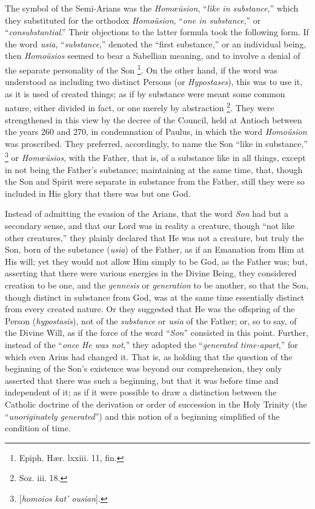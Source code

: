 The symbol of the Semi-Arians was the \emph{Homœüsion}, ``\emph{like
in substance},'' which they substituted for the orthodox \emph{Homoüsion},
``\emph{one in substance},'' or ``\emph{consubstantial}.''
Their objections to the latter formula took the following form. If the
word \emph{usia}, ``\emph{substance},'' denoted the
``first substance,'' or an individual being, then \emph{Homoüsios}
seemed to bear a Sabellian meaning, and to involve a denial of the
separate personality of the Son \footnote{Epiph. Hær. lxxiii. 11, fin.}. On the other hand, if the word was understood as including two
distinct Persons (or \emph{Hypostases}), this was to use it, as
it is used of created things; as if by substance were meant some
common nature, either divided in fact, or one merely by abstraction \footnote{Soz. iii. 18.}. They were strengthened in this view by the decree of the
Council, held at Antioch between the years 260 and 270, in
condemnation of Paulus, in which the word \emph{Homoüsion} was
proscribed. They preferred, accordingly, to name the Son ``like in
substance,'' \footnote{[\emph{homoios kat' ousian}].} or \emph{Homœüsios},
with the Father, that is, of a substance like in all things, except in
not being the Father's substance; maintaining at the same time, that,
though the Son and Spirit were separate in substance from the Father,
still they were so included in His glory that there was but one God.

Instead of admitting the evasion of the Arians, that the word \emph{Son}
had but a secondary sense, and that our Lord was in reality a
creature, though ``not like other creatures,'' they plainly
declared that He was not a creature, but truly the Son, born of the
substance (\emph{usia}) of the Father, as if an Emanation from Him at
His will; yet they would not allow Him simply to be God, as the Father
was; but, asserting that there were various energies in the Divine
Being, they considered creation to be one, and the \emph{gennesis} or \emph{generation}
to be another, so that the Son, though distinct in substance from God,
was at the same time essentially distinct from every created nature.
Or they suggested that He was the offspring of the Person (\emph{hypostasis}),
not of the \emph{substance} or \emph{usia} of the Father; or, so to
say, of the Divine Will, as if the force of the word ``\emph{Son}''
consisted in this point. Further, instead of the ``\emph{once}
\emph{He was not},'' they adopted the ``\emph{generated
time-apart},'' for which even Arius had changed it. That is, as
holding that the question of the beginning of the Son's existence was
beyond our comprehension, they only asserted that there was such a
beginning, but that it was before time and independent of it; as if it
were possible to draw a distinction between the Catholic doctrine of
the derivation or order of succession in the Holy Trinity (the ``\emph{unoriginately
generated}'') and this notion of a beginning simplified of the
condition of time.

